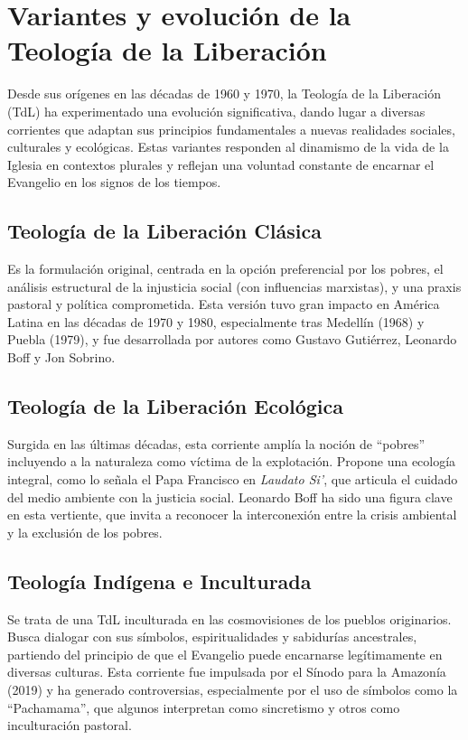 \documentclass[12pt]{article}
\begin{document}
\section*{Variantes y evolución de la Teología de la Liberación}

Desde sus orígenes en las décadas de 1960 y 1970, la Teología de la Liberación (TdL) ha experimentado una evolución significativa, dando lugar a diversas corrientes que adaptan sus principios fundamentales a nuevas realidades sociales, culturales y ecológicas. Estas variantes responden al dinamismo de la vida de la Iglesia en contextos plurales y reflejan una voluntad constante de encarnar el Evangelio en los signos de los tiempos.
\subsection{Teología de la Liberación Clásica}
Es la formulación original, centrada en la opción preferencial por los pobres, el análisis estructural de la injusticia social (con influencias marxistas), y una praxis pastoral y política comprometida. Esta versión tuvo gran impacto en América Latina en las décadas de 1970 y 1980, especialmente tras Medellín (1968) y Puebla (1979), y fue desarrollada por autores como Gustavo Gutiérrez, Leonardo Boff y Jon Sobrino.

\subsection{Teología de la Liberación Ecológica}
Surgida en las últimas décadas, esta corriente amplía la noción de ``pobres'' incluyendo a la naturaleza como víctima de la explotación. Propone una ecología integral, como lo señala el Papa Francisco en \textit{Laudato Si'}, que articula el cuidado del medio ambiente con la justicia social. Leonardo Boff ha sido una figura clave en esta vertiente, que invita a reconocer la interconexión entre la crisis ambiental y la exclusión de los pobres.

\subsection{Teología Indígena e Inculturada}
Se trata de una TdL inculturada en las cosmovisiones de los pueblos originarios. Busca dialogar con sus símbolos, espiritualidades y sabidurías ancestrales, partiendo del principio de que el Evangelio puede encarnarse legítimamente en diversas culturas. Esta corriente fue impulsada por el Sínodo para la Amazonía (2019) y ha generado controversias, especialmente por el uso de símbolos como la ``Pachamama'', que algunos interpretan como sincretismo y otros como inculturación pastoral.
\end{document}
